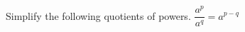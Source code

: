 \documentclass[12pt, a4paper, addpoints]{exam}
\newcommand{\ms}{\vspace{20mm}}
\newcommand{\multiplypowers}[4]{%
    \ensuremath{#1^{#2} \cdot #3^{#4}} %
}
\begin{document}
\begin{questions}
\begin{multicols}{3}
\begin{parts}
\part  \(     2\cdot 2^3               \) \ms
\part \(  3^{2} \cdot 3^4 \cdot 3^{10}}   \)         \ms
\part \multiplypowers{5}{a}{5}{b}\ms
\part \multiplypowers{3}{4}{5}{6} \ms
\part \(3^{}\cdot 3^2 \cdot3^  p \cdot     \)
\end{parts}
\end{multicols}
\ms








\question Simplify the following quotients of powers. \(\dfrac{a^p}{a^q} = a^{p-q}\)
\setlength{\columnsep}{20pt} 
\begin{multicols}{3}
\begin{parts} 
\part $\dfrac{7^5}{7^2}$ \ms
\part $\dfrac{x^8}{x^3}$ \ms 
\part $\dfrac{a^6}{a^4}$ \ms
\part $\dfrac{9^7}{9^5}$ \ms
\part $\dfrac{m^{3}}{m^{10}}}$ \ms
\part $\dfrac{b}{b^5}$ \ms 
\end{parts}
\end{multicols}






\end{questions}
\end{document}

